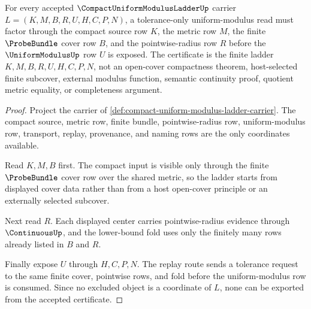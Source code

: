 \begin{theorem}
\label{thm:compact-uniform-modulus-ladder-certificate}
For every accepted $\CompactUniformModulusLadderUp$ carrier $L=(K,M,B,R,U,H,C,P,N)$, a tolerance-only uniform-modulus read must factor through the compact source row $K$, the metric row $M$, the finite $\ProbeBundle$ cover row $B$, and the pointwise-radius row $R$ before the $\UniformModulusUp$ row $U$ is exposed. The certificate is the finite ladder $K,M,B,R,U,H,C,P,N$, not an open-cover compactness theorem, host-selected finite subcover, external modulus function, semantic continuity proof, quotient metric equality, or completeness argument.
\end{theorem}
\begin{proof}
Project the carrier of \autoref{def:compact-uniform-modulus-ladder-carrier}. The compact source, metric row, finite bundle, pointwise-radius row, uniform-modulus row, transport, replay, provenance, and naming rows are the only coordinates available.

Read $K,M,B$ first. The compact input is visible only through the finite $\ProbeBundle$ cover row over the shared metric, so the ladder starts from displayed cover data rather than from a host open-cover principle or an externally selected subcover.

Next read $R$. Each displayed center carries pointwise-radius evidence through $\ContinuousUp$, and the lower-bound fold uses only the finitely many rows already listed in $B$ and $R$.

Finally expose $U$ through $H,C,P,N$. The replay route sends a tolerance request to the same finite cover, pointwise rows, and fold before the uniform-modulus row is consumed. Since no excluded object is a coordinate of $L$, none can be exported from the accepted certificate.
\end{proof}


\begin{closurestatus}{\CompactUniformModulusLadderUp}
  \theoryclosure{\seedClosure}
  \formalstatus{\unformalizedV}
\end{closurestatus}
